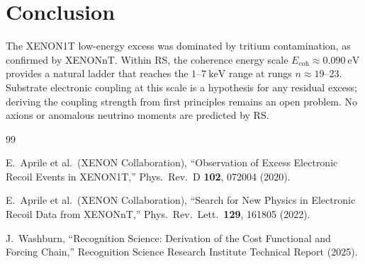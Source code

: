 \documentclass[12pt,a4paper]{article}
\theoremstyle{definition}
\theoremstyle{remark}
\begin{document}
\section{Conclusion}
\label{sec:conclusion}

The XENON1T low-energy excess was dominated by tritium contamination,
as confirmed by XENONnT.  Within RS, the coherence energy scale
$E_{\mathrm{coh}} \approx 0.090~\mathrm{eV}$ provides a natural
ladder that reaches the $1$--$7~\mathrm{keV}$ range at rungs
$n \approx 19$--$23$.  Substrate electronic coupling at this scale
is a hypothesis for any residual excess; deriving the coupling
strength from first principles remains an open problem.  No axions
or anomalous neutrino moments are predicted by RS.

\begin{thebibliography}{99}

E.~Aprile et al.\ (XENON Collaboration),
``Observation of Excess Electronic Recoil Events in XENON1T,''
Phys.\ Rev.\ D \textbf{102}, 072004 (2020).

E.~Aprile et al.\ (XENON Collaboration),
``Search for New Physics in Electronic Recoil Data from XENONnT,''
Phys.\ Rev.\ Lett.\ \textbf{129}, 161805 (2022).

J.~Washburn, ``Recognition Science: Derivation of the Cost
Functional and Forcing Chain,'' Recognition Science Research
Institute Technical Report (2025).

\end{thebibliography}
\end{document}
